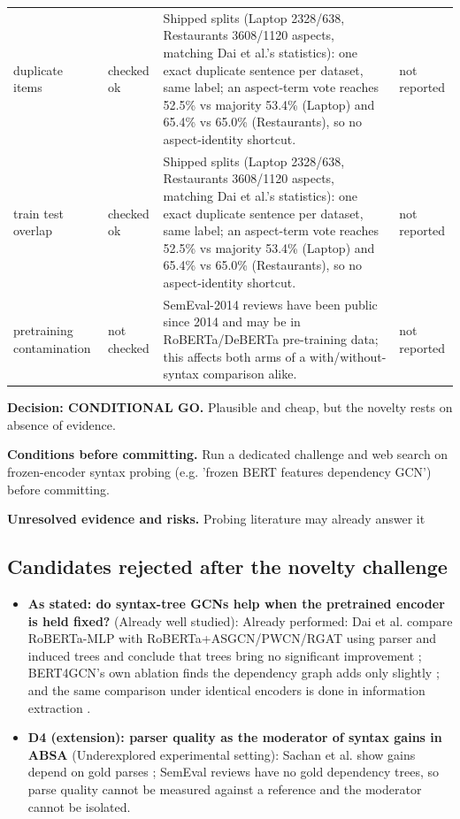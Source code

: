\documentclass[11pt,a4paper]{article}
\begin{document}
{\begin{longtable}{>{\raggedright\arraybackslash}p{}>{\raggedright\arraybackslash}p{}>{\raggedright\arraybackslash}p{}>{\raggedright\arraybackslash}p{}}
duplicate items & checked ok & [V] Shipped splits (Laptop 2328/638, Restaurants 3608/1120 aspects, matching Dai et al.'s statistics): one exact duplicate sentence per dataset, same label; an aspect-term vote reaches 52.5\% vs majority 53.4\% (Laptop) and 65.4\% vs 65.0\% (Restaurants), so no aspect-identity shortcut. \cite{dai2021syntax} & not reported \\
train test overlap & checked ok & [V] Shipped splits (Laptop 2328/638, Restaurants 3608/1120 aspects, matching Dai et al.'s statistics): one exact duplicate sentence per dataset, same label; an aspect-term vote reaches 52.5\% vs majority 53.4\% (Laptop) and 65.4\% vs 65.0\% (Restaurants), so no aspect-identity shortcut. \cite{dai2021syntax} & not reported \\
pretraining contamination & not checked & SemEval-2014 reviews have been public since 2014 and may be in RoBERTa/DeBERTa pre-training data; this affects both arms of a with/without-syntax comparison alike. & not reported \\
\bottomrule
\end{longtable}
}

\textbf{Decision: CONDITIONAL GO.} Plausible and cheap, but the novelty rests on absence of evidence.

\textbf{Conditions before committing.} Run a dedicated challenge and web search on frozen-encoder syntax probing (e.g. 'frozen BERT features dependency GCN') before committing.

\textbf{Unresolved evidence and risks.} Probing literature may already answer it

\subsection{Candidates rejected after the novelty challenge}

\begin{itemize}
\item \textbf{As stated: do syntax-tree GCNs help when the pretrained encoder is held fixed?} (Already well studied): Already performed: Dai et al. compare RoBERTa-MLP with RoBERTa+ASGCN/PWCN/RGAT using parser and induced trees and conclude that trees bring no significant improvement \cite{dai2021syntax}; BERT4GCN's own ablation finds the dependency graph adds only slightly \cite{xiao2021bert4gcn}; and the same comparison under identical encoders is done in information extraction \cite{sachan2021syntax}.
\item \textbf{D4 (extension): parser quality as the moderator of syntax gains in ABSA} (Underexplored experimental setting): Sachan et al. show gains depend on gold parses \cite{sachan2021syntax}; SemEval reviews have no gold dependency trees, so parse quality cannot be measured against a reference and the moderator cannot be isolated.
\end{itemize}
\end{document}
